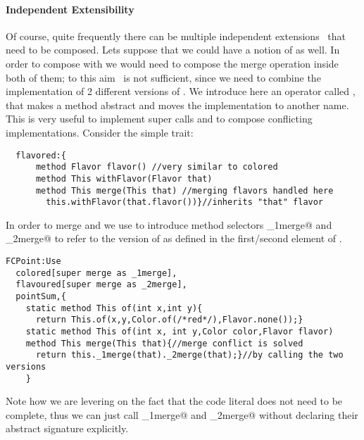 \paragraph{Independent Extensibility}
  Of course, quite frequently there can be multiple independent
  extensions~\cite{Zenger-Odersky2005} that need to be composed. Lets suppose that 
  we could have a notion of \Q@flavoured@ as well.   
  In order to compose \Q@colored@ with \Q@flavored@ we would
  need to compose the merge operation inside both of them; to this aim \use\ is not sufficient, since we need to combine the implementation of 2 different versions of \Q@merge@.
We introduce here an operator called \Q@super@, that
 makes a method abstract and
moves the implementation to another name. This is very useful to implement super calls
 and to compose conflicting implementations.
\noindent Consider the simple \Q@flavored@ trait:
\saveSpace\begin{lstlisting}
  flavored:{
      method Flavor flavor() //very similar to colored
      method This withFlavor(Flavor that)
      method This merge(This that) //merging flavors handled here
        this.withFlavor(that.flavor())}//inherits "that" flavor
\end{lstlisting}  \saveSpace\saveSpace

\noindent In order to merge \Q@colored@ and \Q@flavored@ we use  \Q@super@ to introduce method selectors \Q@_1merge@ and \Q@_2merge@
to refer to the version of \Q@merge@ as defined in the first/second element of \use.

\saveSpace\begin{lstlisting}
FCPoint:Use
  colored[super merge as _1merge],
  flavoured[super merge as _2merge],
  pointSum,{
    static method This of(int x,int y){
      return This.of(x,y,Color.of(/*red*/),Flavor.none());}
    static method This of(int x, int y,Color color,Flavor flavor)
    method This merge(This that){//merge conflict is solved 
      return this._1merge(that)._2merge(that);}//by calling the two versions
    }
\end{lstlisting}  \saveSpace\saveSpace

Note how we are levering on the fact that the code literal
 does not need to be complete, 
thus we can just call \Q@_1merge@ and \Q@_2merge@ without
 declaring their abstract signature explicitly.




